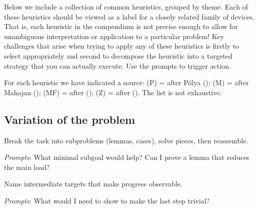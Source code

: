 \documentclass[
  a4paper,
  DIV=11,
  numbers=noendperiod,
  oneside]{scrreprt}
\begin{document}
Below we include a collection of common heuristics, grouped by theme.
Each of these heuristics should be viewed as a label for a closely
related family of devices. That is, each heuristic in the compendium is
not precise enough to allow for unambiguous interpretation or
application to a particular problem! Key challenges that arise when
trying to apply any of these heuristics is firstly to select
appropriately and second to decompose the heuristic into a targeted
strategy that you can actually execute. Use the prompts to trigger
action.

For each heuristic we have indicated a source: (P) = after Pólya
(); (M) = after Mahajan
(); (MF) = after
();
(Z) = after (). The list is not
exhaustive.

\subsection*{Variation of the problem}\label{variation-of-the-problem}

\begin{tcolorbox}[enhanced jigsaw, bottomrule=.15mm, opacitybacktitle=0.6, left=2mm, colframe=quarto-callout-note-color-frame, title={Decomposing and recombining (P, Z)}, opacityback=0, bottomtitle=1mm, coltitle=black, colbacktitle=quarto-callout-note-color!10!white, breakable, toprule=.15mm, rightrule=.15mm, titlerule=0mm, arc=.35mm, colback=white, toptitle=1mm, leftrule=.75mm]

Break the task into subproblems (lemmas, cases), solve pieces, then
reassemble.

\emph{Prompts}: What minimal subgoal would help? Can I prove a lemma
that reduces the main load?

\end{tcolorbox}

\begin{tcolorbox}[enhanced jigsaw, bottomrule=.15mm, opacitybacktitle=0.6, left=2mm, colframe=quarto-callout-note-color-frame, title={Establishing and using subgoals (P, Z)}, opacityback=0, bottomtitle=1mm, coltitle=black, colbacktitle=quarto-callout-note-color!10!white, breakable, toprule=.15mm, rightrule=.15mm, titlerule=0mm, arc=.35mm, colback=white, toptitle=1mm, leftrule=.75mm]

Name intermediate targets that make progress observable.

\emph{Prompts}: What would I need to show to make the last step trivial?

\end{tcolorbox}
\end{document}
